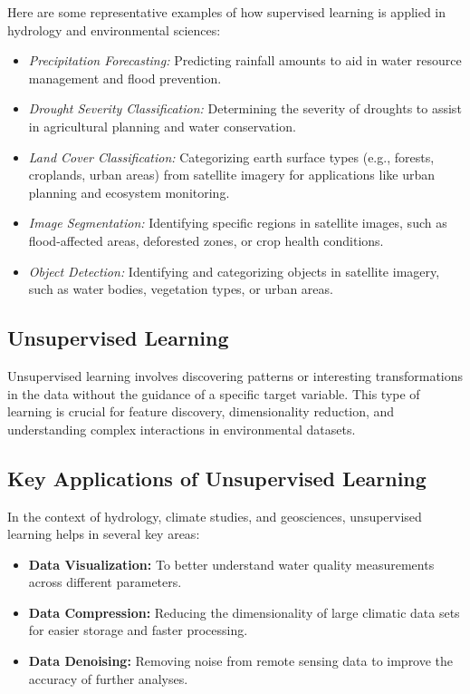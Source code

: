 Here are some representative examples of how supervised learning is applied in hydrology and environmental sciences:
\begin{itemize}
    \item \textit{Precipitation Forecasting:} Predicting rainfall amounts to aid in water resource management and flood prevention.
\item \textit{Drought Severity Classification:} Determining the severity of droughts to assist in agricultural planning and water conservation.
\item \textit{Land Cover Classification:} Categorizing earth surface types (e.g., forests, croplands, urban areas) from satellite imagery for applications like urban planning and ecosystem monitoring.
\item \textit{Image Segmentation:} Identifying specific regions in satellite images, such as flood-affected areas, deforested zones, or crop health conditions.
\item \textit{Object Detection:} Identifying and categorizing objects in satellite imagery, such as water bodies, vegetation types, or urban areas.
\end{itemize}


\subsection{Unsupervised Learning }

Unsupervised learning involves discovering patterns or interesting transformations in the data without the guidance of a specific target variable. This type of learning is crucial for feature discovery, dimensionality reduction, and understanding complex interactions in environmental datasets.

\subsection{Key Applications of Unsupervised Learning}
In the context of hydrology, climate studies, and geosciences, unsupervised learning helps in several key areas:

\begin{itemize}
    \item \textbf{Data Visualization:} To better understand water quality measurements across different parameters.
    \item \textbf{Data Compression:} Reducing the dimensionality of large climatic data sets for easier storage and faster processing.
    \item \textbf{Data Denoising:} Removing noise from remote sensing data to improve the accuracy of further analyses.
\end{itemize}

